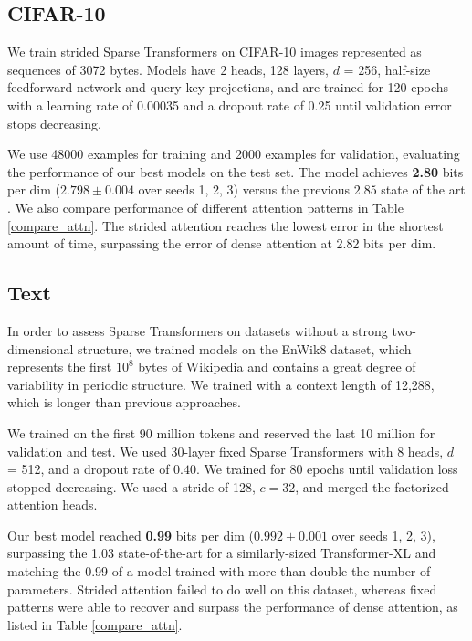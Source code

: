 \documentclass{article}
\begin{document}
\subsection{CIFAR-10}

We train strided Sparse Transformers on CIFAR-10 images represented as sequences of 3072 bytes. Models have 2 heads, 128 layers, $d$ = 256, half-size feedforward network and query-key projections, and are trained for 120 epochs with a learning rate of 0.00035 and a dropout rate of 0.25 until validation error stops decreasing.

We use 48000 examples for training and 2000 examples for validation, evaluating the performance of our best models on the test set. The model achieves \textbf{2.80} bits per dim ($2.798 \pm 0.004$ over seeds 1, 2, 3) versus the previous $2.85$ state of the art \cite{chen2017pixelsnail}. We also compare performance of different attention patterns in Table \ref{compare_attn}. The strided attention reaches the lowest error in the shortest amount of time, surpassing the error of dense attention at 2.82 bits per dim.

\subsection{Text}
In order to assess Sparse Transformers on datasets without a strong two-dimensional structure, we trained models on the EnWik8 dataset, which represents the first $10^{8}$ bytes of Wikipedia and contains a great degree of variability in periodic structure. We trained with a context length of 12,288, which is longer than previous approaches.

We trained on the first 90 million tokens and reserved the last 10 million for validation and test. We used 30-layer fixed Sparse Transformers with 8 heads, $d$ = 512, and a dropout rate of $0.40$. We trained for 80 epochs until validation loss stopped decreasing. We used a stride of 128, $c = 32$, and merged the factorized attention heads.

Our best model reached \textbf{0.99} bits per dim ($0.992 \pm 0.001$ over seeds 1, 2, 3), surpassing the 1.03 state-of-the-art for a similarly-sized Transformer-XL  \cite{dai2018transformer} and matching the 0.99 of a model trained with more than double the number of parameters. Strided attention failed to do well on this dataset, whereas fixed patterns were able to recover and surpass the performance of dense attention, as listed in Table \ref{compare_attn}.
\end{document}
